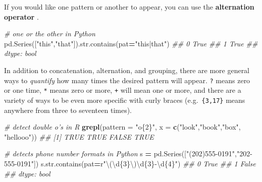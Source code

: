 \documentclass[12pt,krantz2]{krantz}
\makeatletter
\newenvironment{Shaded}{\begin{snugshade}}{\end{snugshade}}
\newcommand{\BuiltInTok}[1]{#1}
\newcommand{\CommentTok}[1]{\textcolor[rgb]{0.37,0.37,0.37}{\textit{#1}}}
\newcommand{\DataTypeTok}[1]{\textcolor[rgb]{0.27,0.27,0.27}{#1}}
\newcommand{\KeywordTok}[1]{\textcolor[rgb]{0.27,0.27,0.27}{\textbf{#1}}}
\newcommand{\NormalTok}[1]{#1}
\newcommand{\OperatorTok}[1]{\textcolor[rgb]{0.43,0.43,0.43}{\textbf{#1}}}
\newcommand{\SpecialCharTok}[1]{\textcolor[rgb]{0,0,0}{#1}}
\newcommand{\StringTok}[1]{\textcolor[rgb]{0.5,0.5,0.5}{#1}}
\newcommand{\VerbatimStringTok}[1]{\textcolor[rgb]{0.5,0.5,0.5}{#1}}
\newenvironment{kframe}{%
\medskip{}
\setlength{\fboxsep}{.8em}
 \def\at@end@of@kframe{}%
 \ifinner\ifhmode%
  \def\at@end@of@kframe{\end{minipage}}%
  \begin{minipage}{\columnwidth}%
 \fi\fi%
 \def\FrameCommand##1{\hskip\@totalleftmargin \hskip-\fboxsep
 \colorbox{shadecolor}{##1}\hskip-\fboxsep
     \hskip-\linewidth \hskip-\@totalleftmargin \hskip\columnwidth}%
 \MakeFramed {\advance\hsize-\width
   \@totalleftmargin\z@ \linewidth\hsize
   \@setminipage}}%
 {\par\unskip\endMakeFramed%
 \at@end@of@kframe}
\renewenvironment{Shaded}{\begin{kframe}}{\end{kframe}}
\makeatother
\begin{document}
If you would like one pattern or another to appear, you can use the \textbf{alternation operator} \texttt{\textbar{}}.

\begin{Shaded}
\begin{Highlighting}[]
\CommentTok{# one or the other in Python}
\NormalTok{pd.Series([}\StringTok{"this"}\NormalTok{,}\StringTok{"that"}\NormalTok{]).}\BuiltInTok{str}\NormalTok{.contains(pat}\OperatorTok{=}\StringTok{"this|that"}\NormalTok{)}
\CommentTok{## 0    True}
\CommentTok{## 1    True}
\CommentTok{## dtype: bool}
\end{Highlighting}
\end{Shaded}

In addition to concatenation, alternation, and grouping, there are more general ways to \emph{quantify} how many times the desired pattern will appear. \texttt{?} means zero or one time, \texttt{*} means zero or more, \texttt{+} will mean one or more, and there are a variety of ways to be even more specific with curly braces (e.g.~\texttt{\{3,17\}} means anywhere from three to seventeen times).

\begin{Shaded}
\begin{Highlighting}[]
\CommentTok{# detect double o's in R}
\KeywordTok{grepl}\NormalTok{(}\DataTypeTok{pattern =} \StringTok{"o\{2\}"}\NormalTok{, }\DataTypeTok{x =} \KeywordTok{c}\NormalTok{(}\StringTok{"look"}\NormalTok{,}\StringTok{"book"}\NormalTok{,}\StringTok{"box"}\NormalTok{, }\StringTok{"hellooo"}\NormalTok{))}
\CommentTok{## [1]  TRUE  TRUE FALSE  TRUE}
\end{Highlighting}
\end{Shaded}

\begin{Shaded}
\begin{Highlighting}[]
\CommentTok{# detects phone number formats in Python}
\NormalTok{s }\OperatorTok{=}\NormalTok{ pd.Series([}\StringTok{"(202)555-0191"}\NormalTok{,}\StringTok{"202-555-0191"}\NormalTok{])}
\NormalTok{s.}\BuiltInTok{str}\NormalTok{.contains(pat}\OperatorTok{=}\VerbatimStringTok{r"\textbackslash{}(\textbackslash{}d}\SpecialCharTok{\{3\}}\VerbatimStringTok{\textbackslash{})\textbackslash{}d}\SpecialCharTok{\{3\}}\VerbatimStringTok{-\textbackslash{}d}\SpecialCharTok{\{4\}}\VerbatimStringTok{"}\NormalTok{)}
\CommentTok{## 0     True}
\CommentTok{## 1    False}
\CommentTok{## dtype: bool}
\end{Highlighting}
\end{Shaded}
\end{document}
